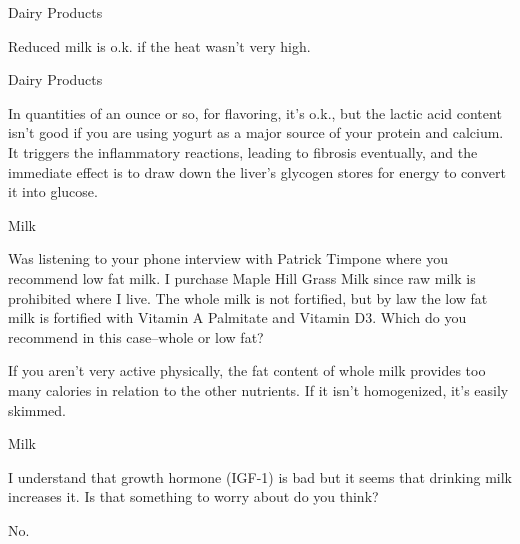 \documentclass[11pt,oneside,openany,extrafontsizes]{memoir}
\begin{document}
\begin{standalonequote}{Dairy Products}

    \begin{answer}
        Reduced milk is o.k. if the heat wasn't very high.
    \end{answer}
\end{standalonequote}

\begin{standalonequote}{Dairy Products}

    \begin{answer}
        In quantities of an ounce or so, for flavoring, it's o.k., but the lactic acid content isn't good if you are using yogurt as a major source of your protein and calcium. It triggers the inflammatory reactions, leading to fibrosis eventually, and the immediate effect is to draw down the liver's glycogen stores for energy to convert it into glucose.
    \end{answer}
\end{standalonequote}

\begin{qaexchange}{Milk}

    \begin{question}
        Was listening to your phone interview with Patrick Timpone where you recommend low fat milk. I purchase Maple Hill Grass Milk since raw milk is prohibited where I live. The whole milk is not fortified, but by law the low fat milk is fortified with Vitamin A Palmitate and Vitamin D3. Which do you recommend in this case--whole or low fat?
    \end{question}

    \begin{answer}
        If you aren't very active physically, the fat content of whole milk provides too many calories in relation to the other nutrients. If it isn't homogenized, it's easily skimmed.
    \end{answer}
\end{qaexchange}

\begin{qaexchange}{Milk}

    \begin{question}
        I understand that growth hormone (IGF-1) is bad but it seems that drinking milk increases it. Is that something to worry about do you think?
    \end{question}

    \begin{answer}
        No.
    \end{answer}
\end{qaexchange}
\end{document}

